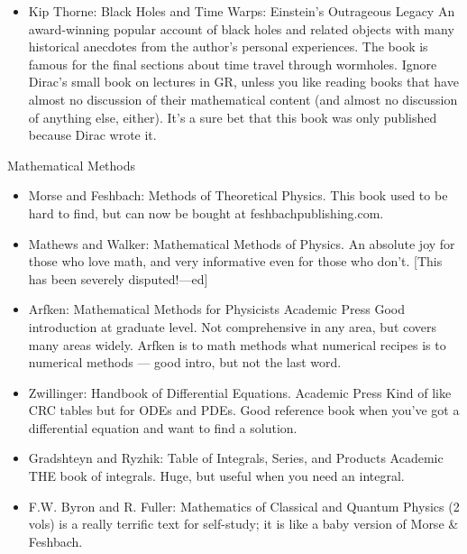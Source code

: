 \documentclass[10pt,a4paper]{book}
\theoremstyle{definition}
\begin{document}
\begin{itemize}
\item Kip Thorne: Black Holes and Time Warps: Einstein's Outrageous Legacy
An award-winning popular account of black holes and related objects with many historical anecdotes from the author's personal experiences.  The book is famous for the final sections about time travel through wormholes.
Ignore Dirac's small book on lectures in GR, unless you like reading books that have almost no discussion of their mathematical content (and almost no discussion of anything else, either).  It's a sure bet that this book was only published because Dirac wrote it.
\end{itemize}


Mathematical Methods
\begin{itemize}
\item 
Morse and Feshbach: Methods of Theoretical Physics.  This book used to be hard to find, but can now be bought at feshbachpublishing.com.
\item Mathews and Walker: Mathematical Methods of Physics.  An absolute joy for those who love math, and very informative even for those who don't.  [This has been severely disputed!—ed]

\item Arfken: Mathematical Methods for Physicists Academic Press
Good introduction at graduate level.  Not comprehensive in any area, but covers many areas widely.  Arfken is to math methods what numerical recipes is to numerical methods — good intro, but not the last word.
\item Zwillinger: Handbook of Differential Equations. Academic Press
Kind of like CRC tables but for ODEs and PDEs.  Good reference book when you've got a differential equation and want to find a solution.
\item Gradshteyn and Ryzhik: Table of Integrals, Series, and Products Academic
THE book of integrals.  Huge, but useful when you need an integral.
\item F.W. Byron and R. Fuller: Mathematics of Classical and Quantum Physics (2 vols)
is a really terrific text for self-study; it is like a baby version of Morse \& Feshbach.
\end{itemize}
\end{document}
